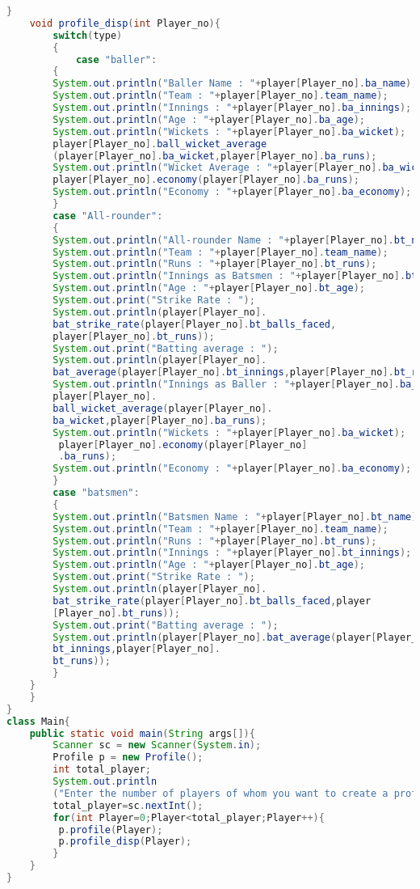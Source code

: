 \documentclass{article}
\begin{document}
\begin{lstlisting}[style=chstyle,language=Java]
    }
    void profile_disp(int Player_no){
        switch(type)
        {
            case "baller":
        {
        System.out.println("Baller Name : "+player[Player_no].ba_name);
        System.out.println("Team : "+player[Player_no].team_name);
        System.out.println("Innings : "+player[Player_no].ba_innings);
        System.out.println("Age : "+player[Player_no].ba_age);
        System.out.println("Wickets : "+player[Player_no].ba_wicket);
        player[Player_no].ball_wicket_average
        (player[Player_no].ba_wicket,player[Player_no].ba_runs);
        System.out.println("Wicket Average : "+player[Player_no].ba_wicket_average);
        player[Player_no].economy(player[Player_no].ba_runs);
        System.out.println("Economy : "+player[Player_no].ba_economy);
        }
        case "All-rounder":
        {
        System.out.println("All-rounder Name : "+player[Player_no].bt_name);
        System.out.println("Team : "+player[Player_no].team_name);
        System.out.println("Runs : "+player[Player_no].bt_runs);
        System.out.println("Innings as Batsmen : "+player[Player_no].bt_innings);
        System.out.println("Age : "+player[Player_no].bt_age);
        System.out.print("Strike Rate : ");
        System.out.println(player[Player_no].
        bat_strike_rate(player[Player_no].bt_balls_faced,
        player[Player_no].bt_runs));
        System.out.print("Batting average : ");
        System.out.println(player[Player_no].
        bat_average(player[Player_no].bt_innings,player[Player_no].bt_runs));
        System.out.println("Innings as Baller : "+player[Player_no].ba_innings);
        player[Player_no].
        ball_wicket_average(player[Player_no].
        ba_wicket,player[Player_no].ba_runs);
        System.out.println("Wickets : "+player[Player_no].ba_wicket);
         player[Player_no].economy(player[Player_no]
         .ba_runs);
        System.out.println("Economy : "+player[Player_no].ba_economy);
        }
        case "batsmen":
        {
        System.out.println("Batsmen Name : "+player[Player_no].bt_name);
        System.out.println("Team : "+player[Player_no].team_name);
        System.out.println("Runs : "+player[Player_no].bt_runs);
        System.out.println("Innings : "+player[Player_no].bt_innings);
        System.out.println("Age : "+player[Player_no].bt_age);
        System.out.print("Strike Rate : ");
        System.out.println(player[Player_no].
        bat_strike_rate(player[Player_no].bt_balls_faced,player
        [Player_no].bt_runs));
        System.out.print("Batting average : ");
        System.out.println(player[Player_no].bat_average(player[Player_no].
        bt_innings,player[Player_no].
        bt_runs));
        }
    }
    }
}
class Main{
    public static void main(String args[]){
        Scanner sc = new Scanner(System.in);
        Profile p = new Profile();
        int total_player;
        System.out.println
        ("Enter the number of players of whom you want to create a profile");
        total_player=sc.nextInt();
        for(int Player=0;Player<total_player;Player++){
         p.profile(Player);
         p.profile_disp(Player);
        }
    }
}


\end{lstlisting}
\end{document}
